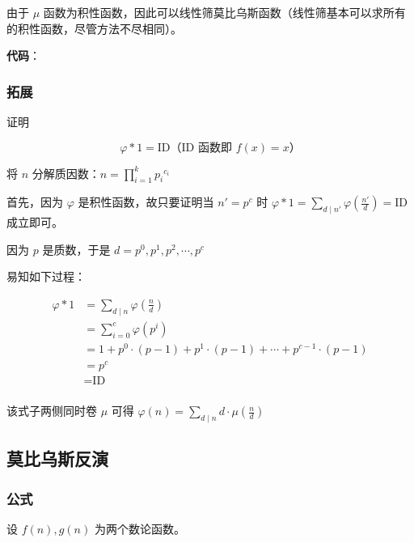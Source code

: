由于 $\mu$ 函数为积性函数，因此可以线性筛莫比乌斯函数（线性筛基本可以求所有的积性函数，尽管方法不尽相同）。

\textbf{代码}：


\subsubsection{拓展}

证明

$$
\varphi*1=\text{ID}\text{（ID 函数即 } f(x)=x\text{）}
$$

将 $n$ 分解质因数：$\displaystyle n=\prod_{i=1}^k {p_i}^{c_i}$

首先，因为 $\varphi$ 是积性函数，故只要证明当 $n'=p^c$ 时 $\displaystyle\varphi*1=\sum_{d\mid n'}\varphi(\frac{n'}{d})=\text{ID}$ 成立即可。

因为 $p$ 是质数，于是 $d=p^0,p^1,p^2,\cdots,p^c$

易知如下过程：

$$
\begin{align*}
\varphi*1&=\sum_{d\mid n}\varphi(\frac{n}{d})\\
&=\sum_{i=0}^c\varphi(p^i)\\
&=1+p^0\cdot(p-1)+p^1\cdot(p-1)+\cdots+p^{c-1}\cdot(p-1)\\
&=p^c\\
&=\text{ID}\\
\end{align*}
$$

该式子两侧同时卷 $\mu$ 可得 $\displaystyle\varphi(n)=\sum_{d\mid n}d\cdot\mu(\frac{n}{d})$

\hr

\subsection{莫比乌斯反演}

\subsubsection{公式}

设 $f(n),g(n)$ 为两个数论函数。

